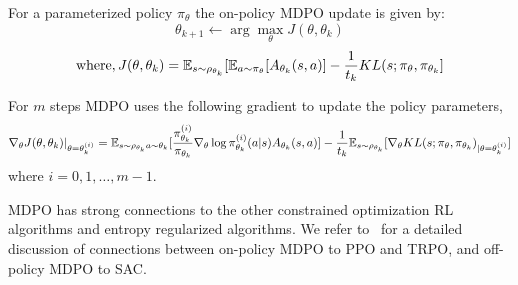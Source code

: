 For a parameterized policy $ \pi_{\theta}$ the on-policy MDPO update is given by: $$ \theta_{k+1}
	\leftarrow \arg \max_{\theta} J(\theta, \theta_k)$$ $$ \text{where}, J(\theta, \theta_k) = \mathbb{E}_{s
		\sim \rho_{\theta_k}} [ \mathbb{E}_{a \sim \pi_\theta}[A_{\theta_k}(s,a)] - \frac{1}{t_k} KL(s; \pi_\theta,
		\pi_{\theta_k}]$$

For $m$ steps MDPO uses the following gradient to update the
policy parameters,
\begin{equation}
	\label{eqn:mdpograd} \nabla_{\theta} J(\theta,
	\theta_k)|_{\theta = \theta_k^{(i)}} = \mathbb{E}_{s \sim \rho_{\theta_k} \\ a \sim \theta_k} [ \frac{
			\pi_{\theta_k}^{(i)}}{ \pi_{\theta_k}} \nabla_{\theta} \log \pi_{\theta_k}^{(i)} (a|s)
		A_{\theta_k}(s,a)] - \frac{1}{t_k} \mathbb{E}_{s \sim \rho_{\theta_k}} [\nabla_\theta KL(s; \pi_\theta,
		\pi_{\theta_k})_{|\theta= \theta_k^{(i)}}]
\end{equation} where $i=0,1,\ldots,m-1$.






MDPO has strong connections to the other constrained optimization RL algorithms and entropy regularized
algorithms.
We refer to~\cite{tomarMirror2022} for a detailed discussion of connections between on-policy MDPO
to PPO and TRPO, and off-policy MDPO to SAC.

